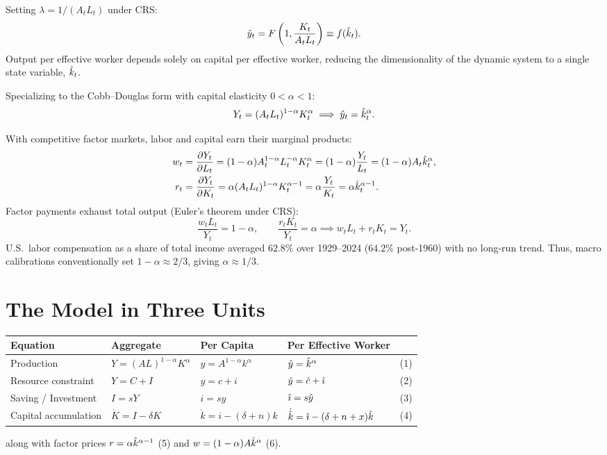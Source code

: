 \documentclass[11pt]{article}
\begin{document}
 Setting $\lambda = 1 / (A_t L_t)$ under CRS:
\[
\hat{y}_t = F\left(1, \frac{K_t}{A_t L_t}\right) \equiv f(\hat{k}_t).
\]
Output per effective worker depends solely on capital per effective worker, reducing the dimensionality of the dynamic system to a single state variable, $\hat{k}_t$.

Specializing to the Cobb--Douglas form with capital elasticity $0 < \alpha < 1$:
\[
Y_t = (A_t L_t)^{1-\alpha} K_t^{\alpha} \implies \hat{y}_t = \hat{k}_t^\alpha.
\]

With competitive factor markets, labor and capital earn their marginal products:
\begin{align*}
w_t &= \frac{\partial Y_t}{\partial L_t} = (1-\alpha) A_t^{1-\alpha} L_t^{-\alpha} K_t^{\alpha} = (1-\alpha)\frac{Y_t}{L_t} = (1-\alpha) A_t \hat{k}_t^{\alpha}, \\
r_t &= \frac{\partial Y_t}{\partial K_t} = \alpha (A_t L_t)^{1-\alpha} K_t^{\alpha-1} = \alpha\frac{Y_t}{K_t} = \alpha \hat{k}_t^{\alpha-1}.
\end{align*}
Factor payments exhaust total output (Euler's theorem under CRS):
\[
\frac{w_t L_t}{Y_t} = 1-\alpha, \qquad \frac{r_t K_t}{Y_t} = \alpha \implies w_t L_t + r_t K_t = Y_t.
\]
 U.S.\ labor compensation as a share of total income averaged $62.8\%$ over 1929--2024 ($64.2\%$ post-1960) with no long-run trend. Thus, macro calibrations conventionally set $1-\alpha \approx 2/3$, giving $\alpha \approx 1/3$.

\section{The Model in Three Units}

\begin{center}
\begin{tabular}{@{}llllr@{}}
\toprule
Equation & Aggregate & Per Capita & Per Effective Worker & \\
\midrule
Production & $Y = (AL)^{1-\alpha} K^\alpha$ & $y = A^{1-\alpha} k^\alpha$ & $\hat{y} = \hat{k}^\alpha$ & (1) \\
Resource constraint & $Y = C + I$ & $y = c + i$ & $\hat{y} = \hat{c} + \hat{\imath}$ & (2) \\
Saving / Investment & $I = sY$ & $i = sy$ & $\hat{\imath} = s\hat{y}$ & (3) \\
Capital accumulation & $\dot{K} = I - \delta K$ & $\dot{k} = i - (\delta + n)k$ & $\dot{\hat{k}} = \hat{\imath} - (\delta+n+x)\hat{k}$ & (4) \\
\bottomrule
\end{tabular}
\end{center}
along with factor prices $r = \alpha \hat{k}^{\alpha-1}$ (5) and $w = (1-\alpha)A\hat{k}^\alpha$ (6).
\end{document}
